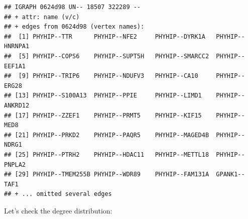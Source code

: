 \documentclass[
]{book}
\newenvironment{Shaded}{\begin{snugshade}}{\end{snugshade}}
\newcommand{\AttributeTok}[1]{\textcolor[rgb]{0.77,0.63,0.00}{#1}}
\newcommand{\FunctionTok}[1]{\textcolor[rgb]{0.00,0.00,0.00}{#1}}
\newcommand{\NormalTok}[1]{#1}
\newcommand{\OtherTok}[1]{\textcolor[rgb]{0.56,0.35,0.01}{#1}}
\newcommand{\SpecialCharTok}[1]{\textcolor[rgb]{0.00,0.00,0.00}{#1}}
\newcommand{\StringTok}[1]{\textcolor[rgb]{0.31,0.60,0.02}{#1}}
\begin{document}
\begin{verbatim}
## IGRAPH 0624d98 UN-- 18507 322289 -- 
## + attr: name (v/c)
## + edges from 0624d98 (vertex names):
##  [1] PHYHIP--TTR      PHYHIP--NFE2     PHYHIP--DYRK1A   PHYHIP--HNRNPA1 
##  [5] PHYHIP--COPS6    PHYHIP--SUPT5H   PHYHIP--SMARCC2  PHYHIP--EEF1A1  
##  [9] PHYHIP--TRIP6    PHYHIP--NDUFV3   PHYHIP--CA10     PHYHIP--ERG28   
## [13] PHYHIP--S100A13  PHYHIP--PPIE     PHYHIP--LIMD1    PHYHIP--ANKRD12 
## [17] PHYHIP--ZZEF1    PHYHIP--PRMT5    PHYHIP--KIF15    PHYHIP--MED8    
## [21] PHYHIP--PRKD2    PHYHIP--PAQR5    PHYHIP--MAGED4B  PHYHIP--NDRG1   
## [25] PHYHIP--PTRH2    PHYHIP--HDAC11   PHYHIP--METTL18  PHYHIP--PNPLA2  
## [29] PHYHIP--TMEM255B PHYHIP--WDR89    PHYHIP--FAM131A  GPANK1--TAF1    
## + ... omitted several edges
\end{verbatim}

Let's check the degree distribution:

\begin{Shaded}
\end{Shaded}
\end{document}
